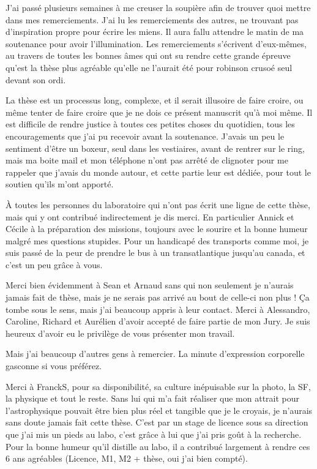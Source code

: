 J'ai passé plusieurs semaines à me creuser la soupière afin de trouver quoi mettre dans mes remerciements. J'ai lu les remerciements 
des autres, ne trouvant pas d'inspiration propre pour écrire les miens. Il aura fallu attendre le matin de ma soutenance pour 
avoir l'illumination. Les remerciements s'écrivent d'eux-mêmes, au travers de toutes les bonnes âmes qui ont su rendre cette 
grande épreuve qu'est la thèse plus agréable qu'elle ne l'aurait été pour robinson crusoé seul devant son ordi. 

La thèse est un processus long, complexe, et il serait illusoire de faire croire, ou même tenter de faire croire que je ne dois
ce présent manuscrit qu'à moi même. 
Il est difficile de rendre justice à toutes ces petites choses du quotidien, tous les encouragements que j'ai pu recevoir avant 
la soutenance. J'avais un peu le sentiment d'être un boxeur, seul dans les vestiaires, avant de rentrer sur le ring, mais ma 
boite mail et mon téléphone n'ont pas arrêté de clignoter pour me rappeler que j'avais du monde autour, et cette partie leur 
est dédiée, pour tout le soutien qu'ils m'ont apporté. 

À toutes les personnes du laboratoire qui n'ont pas écrit une ligne de cette thèse, mais qui y ont contribué indirectement je
dis merci. En particulier Annick et Cécile à la préparation des missions, toujours avec le sourire et la bonne humeur malgré mes
questions stupides. Pour un handicapé des transports comme moi, je suis passé de la peur de prendre le bus à un transatlantique
jusqu'au canada, et c'est un peu grâce à vous. 

Merci bien évidemment à Sean et Arnaud sans qui non seulement je n'aurais jamais fait de thèse, mais je ne serais pas arrivé au
bout de celle-ci non plus ! Ça tombe sous le sens, mais j'ai beaucoup appris à leur contact. Merci à Alessandro, Caroline,
Richard et Aurélien d'avoir accepté de faire partie de mon Jury. Je suis heureux d'avoir eu le privilège de vous présenter mon travail.

Mais j'ai beaucoup d'autres gens à remercier. La minute d'expression corporelle gasconne si vous préférez. 

\bigskip

Merci à FranckS, pour sa disponibilité, sa culture inépuisable sur la photo, la SF, la physique et tout le reste. Sans lui qui
m'a fait réaliser que mon attrait pour l'astrophysique pouvait être bien plus réel et tangible que je le croyais, je n'aurais
sans doute jamais fait cette thèse. C'est par un stage de licence sous sa direction que j'ai mis un pieds au labo, c'est grâce à
lui que j'ai pris goût à la recherche. Pour la bonne humeur qu'il distille au labo, il a contribué largement à rendre ces 6 ans
agréables (Licence, M1, M2 + thèse, oui j'ai bien compté).

